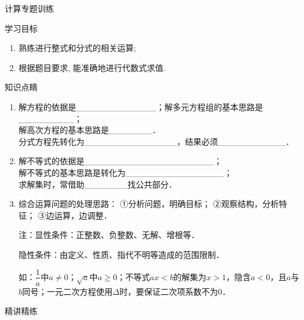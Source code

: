 \begin{center}
{\kaishu{}计算专题训练}
\end{center}


{\heiti 学习目标}
\begin{enumerate}
\item
熟练进行整式和分式的相关运算;

\item
根据题目要求, 能准确地进行代数式求值.
\end{enumerate}

{\heiti 知识点睛}

\begin{enumerate}




\item 解方程的依据是{\_}{\_}{\_}{\_}{\_}{\_}{\_}{\_}{\_}{\_}{\_}{\_}{\_}；解多元方程组的基本思路是{\_}{\_}{\_}{\_}{\_}{\_}{\_}{\_}{\_}；\\
解高次方程的基本思路是{\_}{\_}{\_}{\_}{\_}{\_}{\_}．\\
分式方程先转化为{\_}{\_}{\_}{\_}{\_}{\_}{\_}{\_}{\_}{\_}{\_}{\_}{\_}{\_}{\_}，结果必须{\_}{\_}{\_}{\_}{\_}{\_}{\_}{\_}{\_}{\_}{\_}．
\item 解不等式的依据是{\_}{\_}{\_}{\_}{\_}{\_}{\_}{\_}{\_}{\_}{\_}{\_}{\_}{\_}{\_}{\_}{\_}{\_}{\_}{\_}{\_}；\\
解不等式的基本思路是转化为{\_}{\_}{\_}{\_}{\_}{\_}{\_}{\_}{\_}{\_}{\_}{\_}{\_}{\_}{\_}{\_}；\\
求解集时，常借助{\_}{\_}{\_}{\_}{\_}{\_}{\_}找公共部分．
\item 综合运算问题的处理思路：
①分析问题，明确目标；
②观察结构，分析特征；
③边运算，边调整．

注：显性条件：正整数、负整数、无解、增根等．

隐性条件：由定义、性质、指代不明等造成的范围限制．

如：$\dfrac{1}{a}$中$a\ne $0；$\sqrt a $中$a\ge $0；不等式$ax<b$的解集为$x>1$，隐含$a<0$，且$a$与$b$同号；一元二次方程使用$\Delta $时，要保证二次项系数不为0．
\end{enumerate}

{\heiti 精讲精练}

